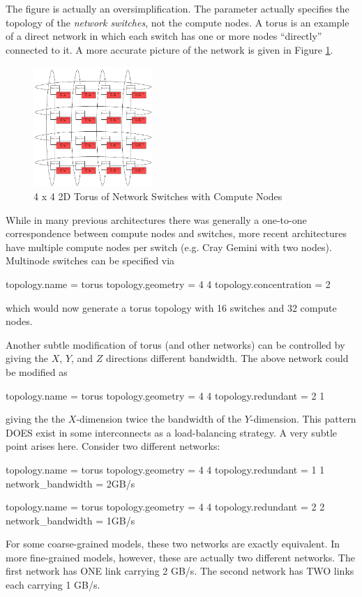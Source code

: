 The figure is actually an oversimplification.  
The  parameter actually specifies the topology of the \emph{network switches}, not the compute nodes. 
A torus is an example of a direct network in which each switch has one or more nodes ``directly'' connected to it.  
A more accurate picture of the network is given in Figure \ref{fig:hdtorus:withnodes}.
\begin{figure}[h]
\centering
\includegraphics[width=0.4\textwidth]{figures/tikz/torus/withnodes.pdf}
\caption{4 x 4 2D Torus of Network Switches with Compute Nodes}
\label{fig:hdtorus:withnodes}
\end{figure}
While in many previous architectures there was generally a one-to-one correspondence between compute nodes and switches, more recent architectures have multiple compute nodes per switch (e.g. Cray Gemini with two nodes).  
Multinode switches can be specified via

\begin{ViFile}
topology.name = torus
topology.geometry = 4 4
topology.concentration = 2
\end{ViFile}
which would now generate a torus topology with 16 switches and 32 compute nodes.

Another subtle modification of torus (and other networks) can be controlled by giving the $X$, $Y$, and $Z$ directions different bandwidth.  
The above network could be modified as

\begin{ViFile}
topology.name = torus
topology.geometry = 4 4
topology.redundant = 2 1
\end{ViFile}
giving the the $X$-dimension twice the bandwidth of the $Y$-dimension.  
This pattern DOES exist in some interconnects as a load-balancing strategy.  
A very subtle point arises here. Consider two different networks:

\begin{ViFile}
topology.name = torus
topology.geometry = 4 4
topology.redundant = 1 1
network_bandwidth = 2GB/s
\end{ViFile}
\begin{ViFile}
topology.name = torus
topology.geometry = 4 4
topology.redundant = 2 2
network_bandwidth = 1GB/s
\end{ViFile}
For some coarse-grained models, these two networks are exactly equivalent.  
In more fine-grained models, however, these are actually two different networks.  
The first network has ONE link carrying 2 GB/s. The second network has TWO links each carrying 1 GB/s.

